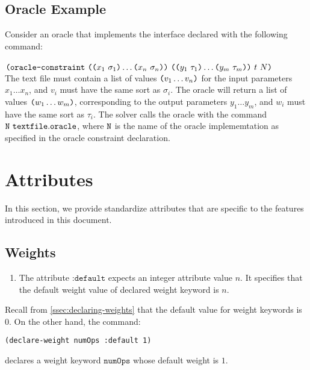 \documentclass[english,a4paper,10pt]{article}
\begin{document}
\subsection{Oracle Example}

\noindent Consider an oracle that implements the interface declared with the following command:\\\\
$\texttt{(}\texttt{oracle-constraint}\mbox{ } 
\texttt{(}\texttt{(}x_1\mbox{ }\sigma_1\texttt{)} \ldots \texttt{(}x_n\mbox{ }\sigma_n\texttt{)}\texttt{)}\mbox{ }
\texttt{(}\texttt{(}y_{1}\mbox{ }\tau_{1}\texttt{)} \ldots \texttt{(}y_{m}\mbox{ }\tau_{m}\texttt{)}\texttt{)}  \mbox{ } t\mbox{ } N \texttt{)}$ \\

The text file must contain a list of values $\texttt{(}v_1 \ldots v_n\texttt{)}$ for the input parameters $x_1 \ldots x_n$, and $v_i$ must have the same sort as $\sigma_i$.
The oracle will return a list of values $\texttt{(}w_{1} \ldots w_{m}\texttt{)}$, corresponding to the output parameters $y_{1} \ldots y_{m}$, and $w_i$ must have the same sort as $\tau_i$.
%
The solver calls the oracle with the command ${\tt N \,\,textfile.oracle}$, where ${\tt N}$ is the name of the oracle implememtation as specified in the oracle constraint declaration.

\section{Attributes}
\label{sec:attr}

In this section, we provide standardize attributes that are specific to
the features introduced in this document.

\subsection{Weights}%
\label{sec:attr-weights}

\begin{enumerate}
\item The attribute $\texttt{:default}$
expects an integer attribute value $n$.
It specifies that the default weight value of declared weight keyword is $n$.
\end{enumerate}
\noindent
Recall from \cref{ssec:declaring-weights} that the default value
for weight keywords is $0$.
On the other hand, the command:
\begin{lstlisting}[language=SyGuS, numbers=none, basicstyle=\ttfamily\small]
(declare-weight numOps :default 1)
\end{lstlisting}
declares a weight keyword $\texttt{numOps}$ whose default weight is $1$.
\end{document}
